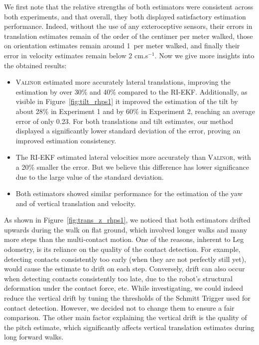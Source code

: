 \documentclass{IJCAS}
\begin{document}
We first note that the relative strengths of both estimators were consistent across both experiments, and that overall, they both displayed satisfactory estimation performance. Indeed, without the use of any exteroceptive sensors, their errors in translation estimates remain of the order of the centimer per meter walked, those on orientation estimates remain around 1\textdegree \ per meter walked, and finally their error in velocity estimates remain below 2 cm.s$^{-1}$. Now we give more insights into the obtained results:
\begin{itemize}
    \item {\scshape Valinor} estimated more accurately lateral translations, improving the estimation by over 30\% and 40\% compared to the RI-EKF. Additionally, as visible in Figure~\ref{fig:tilt_rhps1} it improved the estimation of the tilt by about 28\% in Experiment 1 and by 60\% in Experiment 2, reaching an average error of only 0.23\textdegree. For both translations and tilt estimates, our method displayed a significantly lower standard deviation of the error, proving an improved estimation consistency. 
    \item The RI-EKF estimated lateral velocities more accurately than {\scshape Valinor}, with a 20\% smaller the error. But we believe this difference has lower significance due to the large value of the standard deviation.
    \item Both estimators showed similar performance for the estimation of the yaw and of vertical translation and velocity.
\end{itemize}

As shown in Figure~\ref{fig:trans_z_rhps1}, we noticed that both estimators drifted upwards during the walk on flat ground, which involved longer walks and many more steps than the multi-contact motion. One of the reasons, inherent to Leg odometry, is its reliance on the quality of the contact detection. For example, detecting contacts consistently too early (when they are not perfectly still yet), would cause the estimate to drift on each step. Conversely, drift can also occur when detecting contacts consistently too late, due to the robot's structural deformation under the contact force, etc. While investigating, we could indeed reduce the vertical drift by tuning the thresholds of the Schmitt Trigger used for contact detection. However, we decided not to change them to ensure a fair comparison. The other main factor explaining the vertical drift is the quality of the pitch estimate, which significantly affects vertical translation estimates during long forward walks.
\end{document}
